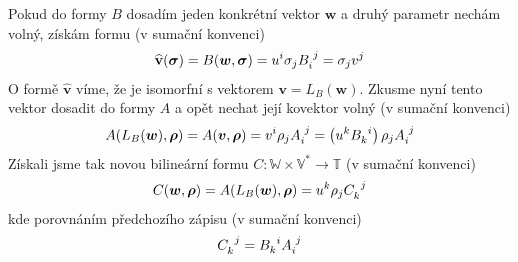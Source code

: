 \documentclass[a5paper,12pt]{amsbook}
\theoremstyle{definition}
\newcommand{\myvec}[1]{\bm{#1}}
\newcommand{\myspace}[1]{\mathbb{#1}}
\newcommand{\mycocovec}[1]{\mathbf{\widehat{#1}}}
\begin{document}
Pokud do formy $B$ dosadím jeden konkrétní vektor $\myvec{w}$ a druhý parametr nechám
volný, získám formu (v sumační konvenci)
\begin{equation*}
\begin{split}
\mycocovec{v}(\myvec{\sigma}) = B(\myvec{w}, \myvec{\sigma}) = u^i \sigma_j B\indices{_i^j}
  = \sigma_j v^j
\end{split}
\end{equation*}
O formě $\mycocovec{v}$ víme, že je isomorfní s vektorem $\myvec{v} = L_B(\myvec{w})$.
Zkusme nyní tento vektor dosadit do formy $A$ a opět nechat její kovektor volný (v sumační
konvenci)
\begin{equation*}
\begin{split}
A(L_B(\myvec{w}), \myvec{\rho})
= A(\myvec{v}, \myvec{\rho}) = v^i \rho_j A\indices{_i^j} 
= \left(u^k B\indices{_k^i}\right) \rho_j A\indices{_i^j}
\end{split}
\end{equation*}
Získali jsme tak novou bilineární formu $C: \myspace{W}\times\myspace{V^*}\rightarrow\myspace{T}$
(v sumační konvenci)
\begin{equation*}
\begin{split}
C(\myvec{w}, \myvec{\rho}) = A(L_B(\myvec{w}), \myvec{\rho}) = u^k \rho_j C\indices{_k^j}
\end{split}
\end{equation*}
kde porovnáním předchozího zápisu (v sumační konvenci)
\begin{equation*}
\begin{split}
C\indices{_k^j} = B\indices{_k^i} A\indices{_i^j}
\end{split}
\end{equation*}
\end{document}
